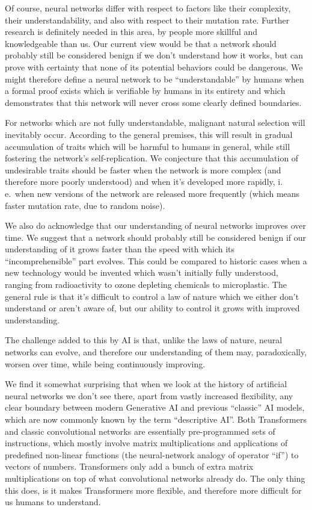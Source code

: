 \documentclass[12pt]{article}
\begin{document}
Of course, neural networks differ with respect to factors like their complexity, their
understandability, and also with respect to their mutation rate. Further research is
definitely needed in this area, by people more skillful and knowledgeable than us. Our
current view would be that a network should probably still be considered benign if we
don't understand how it works, but can prove with certainty that none of its potential
behaviors could be dangerous. We might therefore define a neural network to be
``understandable'' by humans when a formal proof exists which is verifiable by humans in
its entirety and which demonstrates that this network will never cross some clearly
defined boundaries.

For networks which are not fully understandable, malignant natural selection will
inevitably occur. According to the general premises, this will result in gradual
accumulation of traits which will be harmful to humans in general, while still fostering
the network's self-replication. We conjecture that this accumulation of undesirable
traits should be faster when the network is more complex (and therefore more poorly
understood) and when it's developed more rapidly, i.\,e.\ when new versions of the
network are released more frequently (which means faster mutation rate, due to random
noise).

We also do acknowledge that our understanding of neural networks improves over time. We
suggest that a network should probably still be considered benign if our understanding of
it grows faster than the speed with which its ``incomprehensible'' part evolves. This
could be compared to historic cases when a new technology would be invented which wasn't
initially fully understood, ranging from radioactivity to ozone depleting chemicals to
microplastic. The general rule is that it's difficult to control a law of nature which we
either don't understand or aren't aware of, but our ability to control it grows with
improved understanding.

The challenge added to this by AI is that, unlike the laws of nature, neural networks can
evolve, and therefore our understanding of them may, paradoxically, worsen over time,
while being continuously improving.

We find it somewhat surprising that when we look at the history of artificial neural
networks we don't see there, apart from vastly increased flexibility, any clear boundary
between modern Generative AI and previous ``classic'' AI models, which are now commonly
known by the term ``descriptive AI''. Both Transformers and classic convolutional
networks are essentially pre-programmed sets of instructions, which mostly involve matrix
multiplications and applications of predefined non-linear functions (the neural-network
analogy of operator ``if'') to vectors of numbers. Transformers only add a bunch of extra
matrix multiplications on top of what convolutional networks already do. The only thing
this does, is it makes Transformers more flexible, and therefore more difficult for us
humans to understand.
\end{document}
